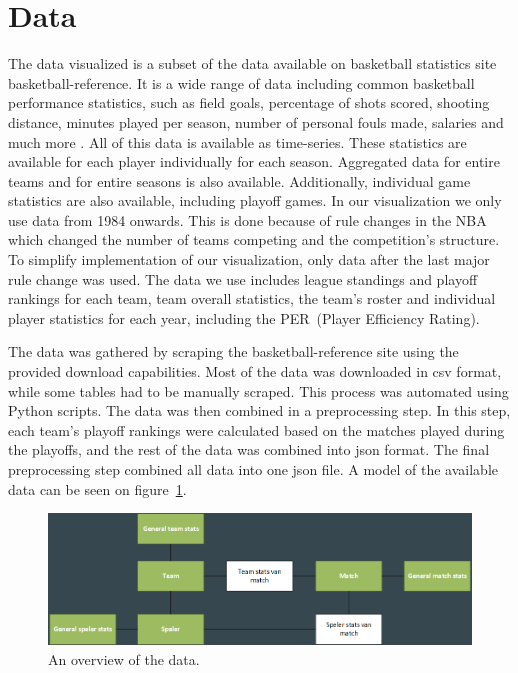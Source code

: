 \documentclass[chi_draft]{sigchi}
\begin{document}
\section{Data}\label{sec:data}
The data visualized is a subset of the data available on basketball statistics
site basketball-reference\cite{basketball-reference}. It is a wide range of data including common basketball performance statistics, such as field goals, percentage of shots scored, shooting distance, minutes played per season, number of personal fouls made, salaries and much more . All of this data is available as time-series. These statistics are available for each player individually for each season. Aggregated data for entire teams and for entire seasons is also available. Additionally, individual game statistics are also available, including playoff games. In our visualization we only use data from 1984 onwards. This is done because of rule changes in the NBA which changed the number of teams competing and the
competition's structure. To simplify implementation of our visualization, only
data after the last major rule change was used.  The data we use includes league
standings and playoff rankings for each team, team overall statistics, the
team's roster and individual player statistics for each year, including the
PER~(Player Efficiency Rating)\cite{per}. 

The data was gathered by scraping the basketball-reference site using the
provided download capabilities. Most of the data was downloaded in csv format,
while some tables had to be manually scraped. This process was automated using
Python scripts. The data was then combined in a preprocessing step. In this
step, each team's playoff rankings were calculated based on the matches played
during the playoffs, and the rest of the data was combined into json format. The
final preprocessing step combined all data into one json file. A model of the
available data can be seen on figure~\ref{fig:data}.

\begin{figure}
\centering
  \includegraphics[width=1.0\columnwidth]{figures/data}
  \caption{An overview of the data.}
  \label{fig:data}
\end{figure}
\end{document}
